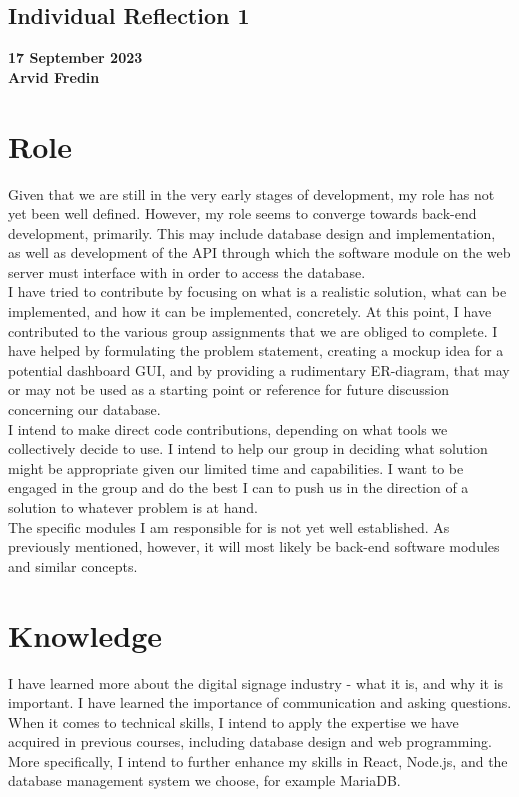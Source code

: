 \documentclass{exam}
\begin{document}
\begin{center}
\section*{Individual Reflection 1}
\end{center}
\textbf{17 September 2023}\\
\textbf{Arvid Fredin}\\
\bigskip

\section{Role}
Given that we are still in the very early stages of development, my role has not yet been well defined. However, my role seems to converge towards back-end development, primarily. This may include database design and implementation, as well as development of the API through which the software module on the web server must interface with in order to access the database.\\
\bigskip
I have tried to contribute by focusing on what is a realistic solution, what can be implemented, and how it can be implemented, concretely. At this point, I have contributed to the various group assignments that we are obliged to complete. I have helped by formulating the problem statement, creating a mockup idea for a potential dashboard GUI, and by providing a rudimentary ER-diagram, that may or may not be used as a starting point or reference for future discussion concerning our database.\\
\bigskip
I intend to make direct code contributions, depending on what tools we collectively decide to use. I intend to help our group in deciding what solution might be appropriate given our limited time and capabilities. I want to be engaged in the group and do the best I can to push us in the direction of a solution to whatever problem is at hand.\\
\bigskip
The specific modules I am responsible for is not yet well established. As previously mentioned, however, it will most likely be back-end software modules and similar concepts.\\
\bigskip 

\section{Knowledge}
I have learned more about the digital signage industry - what it is, and why it is important. I have learned the importance of communication and asking questions. When it comes to technical skills, I intend to apply the expertise we have acquired in previous courses, including database design and web programming. More specifically, I intend to further enhance my skills in React, Node.js, and the database management system we choose, for example MariaDB.\\
\bigskip
\end{document}
